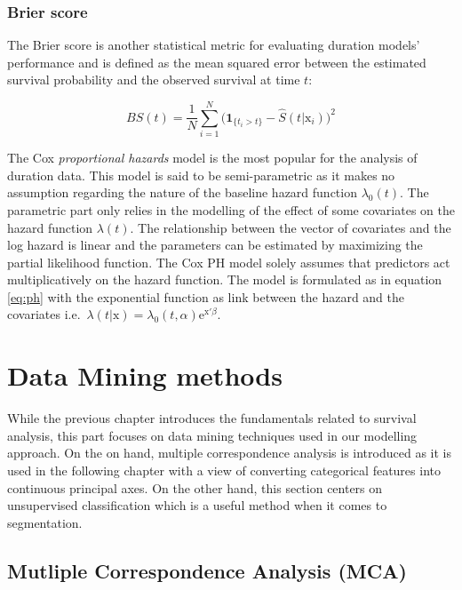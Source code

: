 \documentclass[
]{book}
\begin{document}
\hypertarget{brier-score}{%
\subsection{Brier score}\label{brier-score}}

The Brier score is another statistical metric for evaluating duration models' performance and is defined as the mean squared error between the estimated survival probability and the observed survival at time \(t\):

\begin{equation}
  BS(t) = \frac{1}{N} \sum_{i=1}^{N} \Big(\pmb{1}_{\{t_i>t\}} - \hat{S}(t|\mathrm{x}_i) \Big)^2
  \label{eq:brier}
\end{equation}

The Cox \emph{proportional hazards} model is the most popular for the analysis of duration data. This model is said to be semi-parametric as it makes no assumption regarding the nature of the baseline hazard function \(\lambda_0(t)\). The parametric part only relies in the modelling of the effect of some covariates on the hazard function \(\lambda(t)\). The relationship between the vector of covariates and the log hazard is linear and the parameters can be estimated by maximizing the partial likelihood function. The Cox PH model solely assumes that predictors act multiplicatively on the hazard function. The model is formulated as in equation \eqref{eq:ph} with the exponential function as link between the hazard and the covariates i.e.~\(\lambda(t|\pmb{\mathrm{x}}) = \lambda_0 (t,\alpha) \text{e}^{\pmb{\mathrm{x'}} \beta}\).

\hypertarget{dataMining}{%
\chapter{Data Mining methods}\label{dataMining}}

While the previous chapter introduces the fundamentals related to survival analysis, this part focuses on data mining techniques used in our modelling approach. On the on hand, multiple correspondence analysis is introduced as it is used in the following chapter with a view of converting categorical features into continuous principal axes. On the other hand, this section centers on unsupervised classification which is a useful method when it comes to segmentation.

\hypertarget{mutliple-correspondence-analysis-mca}{%
\section{Mutliple Correspondence Analysis (MCA)}\label{mutliple-correspondence-analysis-mca}}
\end{document}
